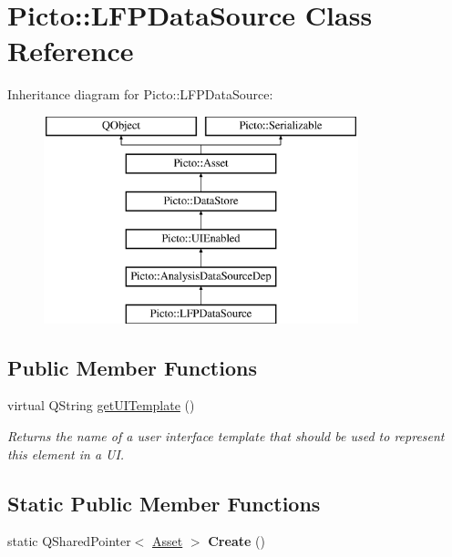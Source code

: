 \hypertarget{class_picto_1_1_l_f_p_data_source}{\section{Picto\-:\-:L\-F\-P\-Data\-Source Class Reference}
\label{class_picto_1_1_l_f_p_data_source}
}
Inheritance diagram for Picto\-:\-:L\-F\-P\-Data\-Source\-:\begin{figure}[H]
\begin{center}
\leavevmode
\includegraphics[height=6.000000cm]{class_picto_1_1_l_f_p_data_source}
\end{center}
\end{figure}
\subsection*{Public Member Functions}
\begin{DoxyCompactItemize}
\item 
\hypertarget{class_picto_1_1_l_f_p_data_source_a94cb33c49cce1bbbad25d810141b72e0}{virtual Q\-String \hyperlink{class_picto_1_1_l_f_p_data_source_a94cb33c49cce1bbbad25d810141b72e0}{get\-U\-I\-Template} ()}\label{class_picto_1_1_l_f_p_data_source_a94cb33c49cce1bbbad25d810141b72e0}

\begin{DoxyCompactList}\small\item\em Returns the name of a user interface template that should be used to represent this element in a U\-I. \end{DoxyCompactList}\end{DoxyCompactItemize}
\subsection*{Static Public Member Functions}
\begin{DoxyCompactItemize}
\item 
\hypertarget{class_picto_1_1_l_f_p_data_source_ac7d1e0f00c6dc214280fa82def5089cb}{static Q\-Shared\-Pointer$<$ \hyperlink{class_picto_1_1_asset}{Asset} $>$ {\bfseries Create} ()}\label{class_picto_1_1_l_f_p_data_source_ac7d1e0f00c6dc214280fa82def5089cb}

\end{DoxyCompactItemize}
